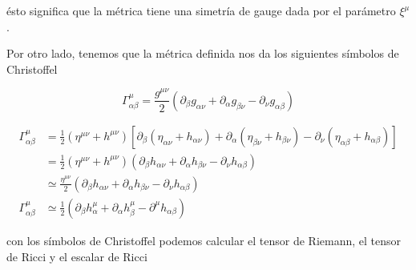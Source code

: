 \noindent
ésto significa que la métrica tiene una simetría de gauge dada por el parámetro $\xi^\mu$.

Por otro lado, tenemos que la métrica definida nos da los siguientes símbolos de Christoffel

\begin{equation}
    \Gamma^\mu_{\alpha \beta} = \frac{g^{\mu \nu}}{2} \left( \partial_\beta g_{\alpha \nu} + \partial_\alpha g_{\beta \nu} - \partial_\nu g_{\alpha \beta} \right)
\end{equation}

\begin{equation}
    \begin{split}
        \Gamma^\mu_{\alpha \beta} &= \frac{1}{2} \left( \eta^{\mu \nu} + h^{\mu \nu} \right) \left[ \partial_\beta \left( \eta_{\alpha \nu} + h_{\alpha \nu} \right) + \partial_\alpha \left( \eta_{\beta \nu} + h_{\beta \nu} \right) - \partial_\nu \left( \eta_{\alpha \beta} + h_{\alpha \beta} \right) \right]\\
        &= \frac{1}{2} \left( \eta^{\mu \nu} + h^{\mu \nu} \right) \left( \partial_\beta h_{\alpha \nu} + \partial_\alpha h_{\beta \nu} - \partial_\nu h_{\alpha \beta} \right)\\
        &\simeq \frac{\eta^{\mu \nu}}{2} \left( \partial_\beta h_{\alpha \nu} + \partial_\alpha h_{\beta \nu} - \partial_\nu h_{\alpha \beta} \right)\\
        \Gamma^\mu_{\alpha \beta} &\simeq \frac{1}{2} \left( \partial_\beta h_\alpha^\mu + \partial_\alpha h_\beta^\mu - \partial^\mu h_{\alpha \beta}  \right)
    \end{split}
\end{equation}

\noindent
con los símbolos de Christoffel podemos calcular el tensor de Riemann, el tensor de Ricci y el escalar de Ricci

